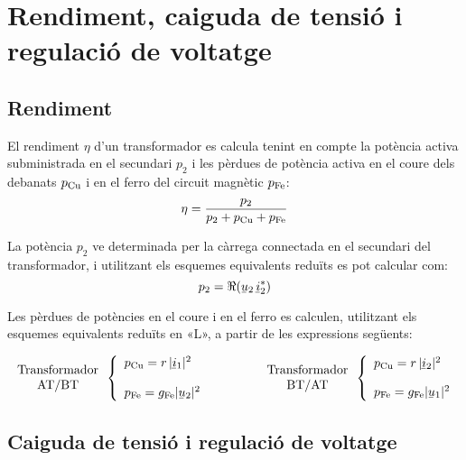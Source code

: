 \section{Rendiment, caiguda de tensió i regulació de voltatge}

\subsection{Rendiment}

El rendiment $\eta$ d'un transformador es calcula tenint en compte la potència activa subministrada en el secundari $p_2$ i les pèrdues de potència activa en el coure dels debanats $p_\mathrm{Cu}$ i en el ferro del circuit magnètic $p_\mathrm{Fe}$:
\begin{equation}
    \eta = \frac{p_2}{p_2 + p_\mathrm{Cu} + p_\mathrm{Fe}}
\end{equation}

La potència $p_2$ ve determinada per la càrrega connectada en el secundari del transformador, i utilitzant els esquemes equivalents reduïts es pot calcular com:
\begin{equation}
    p_2 = \Re(\cmplx{u}_2 \,\cmplx{i}_2^*)
\end{equation}

Les pèrdues de potències  en el coure i en el ferro es calculen, utilitzant els esquemes equivalents reduïts en «L», a partir de les expressions següents:

\begin{equation}
\begin{array}{c}\text{Transformador}\\
\text{AT/BT}
\end{array} \left\{
\begin{array}{l}
   p\ped{Cu} = r \,|\cmplx{i}_1|^2 \\[2.7ex]
   p\ped{Fe} = g\ped{Fe} |\cmplx{u}_2|^2
\end{array}
\right. \qquad\qquad
\begin{array}{c}\text{Transformador}\\
\text{BT/AT}
\end{array} \left\{
\begin{array}{l}
   p\ped{Cu} = r \,|\cmplx{i}_2|^2 \\[2.5ex]
   p\ped{Fe} = g\ped{Fe} |\cmplx{u}_1|^2
\end{array}
\right.
\end{equation}

\subsection{Caiguda de tensió i regulació de voltatge}


